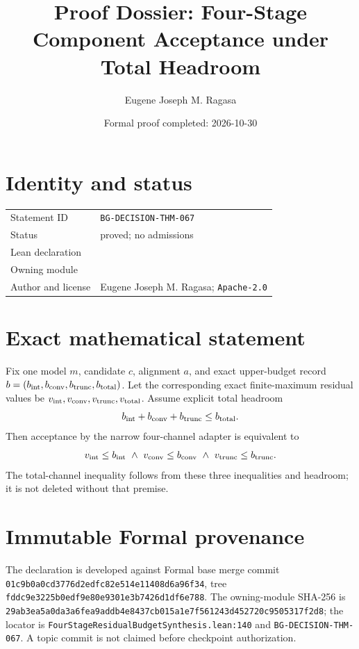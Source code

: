 \documentclass[11pt]{article}
\title{Proof Dossier: Four-Stage Component Acceptance under Total Headroom}
\author{Eugene Joseph M. Ragasa}
\date{Formal proof completed: 2026-10-30}
\begin{document}
\raggedright
\maketitle
\section{Identity and status}
\begin{tabularx}{\textwidth}{@{}lY@{}}
\toprule
Statement ID & \texttt{BG-DECISION-THM-067} \\
Status & proved; no admissions \\
Lean declaration &  \\
Owning module &  \\
Author and license & Eugene Joseph M. Ragasa; \texttt{Apache-2.0} \\
\bottomrule
\end{tabularx}

\section{Exact mathematical statement}
Fix one model $m$, candidate $c$, alignment $a$, and exact upper-budget record
$b=(b_{\rm int},b_{\rm conv},b_{\rm trunc},b_{\rm total})$. Let the corresponding exact
finite-maximum residual values be $v_{\rm int},v_{\rm conv},v_{\rm trunc},v_{\rm total}$.
Assume explicit total headroom
\[
 b_{\rm int}+b_{\rm conv}+b_{\rm trunc}\le b_{\rm total}.
\]
Then acceptance by the narrow four-channel adapter is equivalent to
\[
 v_{\rm int}\le b_{\rm int}\ \land\
 v_{\rm conv}\le b_{\rm conv}\ \land\
 v_{\rm trunc}\le b_{\rm trunc}.
\]
The total-channel inequality follows from these three inequalities and headroom; it is not deleted
without that premise.

\section{Immutable Formal provenance}
The declaration is developed against Formal base merge commit
\texttt{01c9b0a0cd3776d2edfc82e514e11408d6a96f34}, tree
\texttt{fddc9e3225b0edf9e80e9301e3b7426d1df6e788}. The owning-module SHA-256 is
\texttt{29ab3ea5a0da3a6fea9addb4e8437cb015a1e7f561243d452720c9505317f2d8}; the locator is
\texttt{FourStageResidualBudgetSynthesis.lean:140} and \texttt{BG-DECISION-THM-067}. A topic
commit is not claimed before checkpoint authorization.
\end{document}
